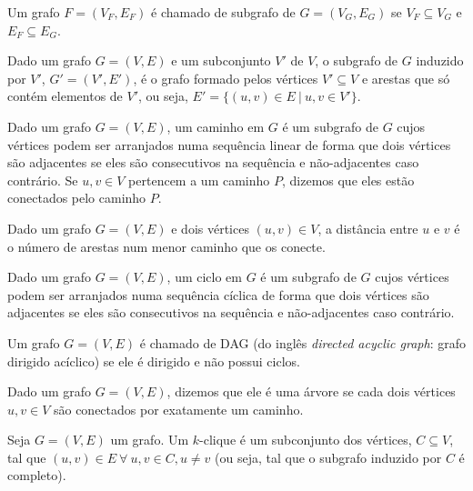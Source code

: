 \begin{definition}[subgrafo]
  Um grafo $F = (V_F, E_F)$ é chamado de subgrafo de $G = (V_G, E_G)$ se $V_F \subseteq V_G$ e $E_F \subseteq E_G$.
\end{definition}

\begin{definition}
  Dado um grafo $G = (V, E)$ e um subconjunto $V'$ de $V$, o subgrafo de $G$ induzido por $V'$, $G' = (V', E')$, é o grafo formado pelos vértices $V' \subseteq V$ e arestas que só contém elementos de $V'$, ou seja, $E' = \{(u, v) \in E \ | \  u, v \in V'\}$.
\end{definition}

\begin{definition}[caminho]
  Dado um grafo $G = (V, E)$, um caminho em $G$ é um subgrafo de $G$ cujos vértices podem ser arranjados numa sequência linear de forma que dois vértices são adjacentes se eles são consecutivos na sequência e não-adjacentes caso contrário. Se $u, v \in V$ pertencem a um caminho $P$, dizemos que eles estão conectados pelo caminho $P$.
\end{definition}

\begin{definition}[distância]
  Dado um grafo $G = (V, E)$ e dois vértices $(u, v) \in V$, a distância entre $u$ e $v$ é o número de arestas num menor caminho que os conecte.
\end{definition}

\begin{definition}[ciclo]
  Dado um grafo $G = (V, E)$, um ciclo em $G$ é um subgrafo de $G$ cujos vértices podem ser arranjados numa sequência cíclica de forma que dois vértices são adjacentes se eles são consecutivos na sequência e não-adjacentes caso contrário.
\end{definition}

\begin{definition}[DAG]
  Um grafo $G = (V, E)$ é chamado de DAG (do inglês \emph{directed acyclic graph}: grafo dirigido acíclico) se ele é dirigido e não possui ciclos.
\end{definition}

\begin{definition}[árvore]
  Dado um grafo $G = (V, E)$, dizemos que ele é uma árvore se cada dois vértices $u, v \in V$ são conectados por exatamente um caminho.
\end{definition}

\begin{definition}[$k$-clique]
  Seja $G = (V, E)$ um grafo. Um $k$-clique é um subconjunto dos vértices, $C \subseteq V$, tal que $(u, v) \in E \ \forall \ u, v \in C, u \neq v$ (ou seja, tal que o subgrafo induzido por $C$ é completo).
\end{definition}


